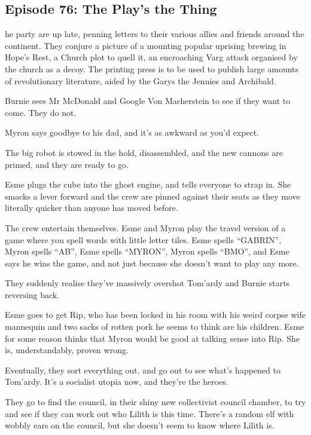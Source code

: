 \subsection{Episode 76: The Play's the Thing}

he party are up late, penning letters to their various allies and friends around the continent. They conjure a picture of a mounting popular uprising brewing in Hope’s Rest, a Church plot to quell it, an encroaching Varg attack organised by the church as a decoy. The printing press is to be used to publish large amounts of revolutionary literature, aided by the Garys the Jennies and Archibald.\medskip

Burnie sees Mr McDonald and Google Von Macherstein to see if they want to come. They do not.\medskip

Myron says goodbye to his dad, and it’s as awkward as you’d expect.\medskip

The big robot is stowed in the hold, disassembled, and the new cannons are primed, and they are ready to go.\medskip

Esme plugs the cube into the ghost engine, and tells everyone to strap in. She smacks a lever forward and the crew are pinned against their seats as they move literally quicker than anyone has moved before.\medskip

The crew entertain themselves. Esme and Myron play the travel version of a game where you spell words with little letter tiles. Esme spells “GABRIN”, Myron spells “AB”, Esme spells “MYRON”, Myron spells “BMO”, and Esme says he wins the game, and not just because she doesn’t want to play any more.\medskip

They suddenly realise they’ve massively overshot Tom’ardy and Burnie starts reversing back.\medskip

Esme goes to get Rip, who has been locked in his room with his weird corpse wife mannequin and two sacks of rotten pork he seems to think are his children. Esme for some reason thinks that Myron would be good at talking sense into Rip. She is, understandably, proven wrong.\medskip

Eventually, they sort everything out, and go out to see what’s happened to Tom’ardy. It’s a socialist utopia now, and they’re the heroes.\medskip

They go to find the council, in their shiny new collectivist council chamber, to try and see if they can work out who Lilith is this time. There’s a random elf with wobbly ears on the council, but she doesn’t seem to know where Lilith is.\medskip

